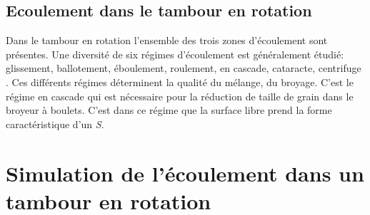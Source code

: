 \subsection{Ecoulement dans le tambour en rotation}

Dans le tambour en rotation l'ensemble des trois zones d'écoulement sont présentes. Une diversité de six régimes d'écoulement est généralement étudié: glissement, ballotement, éboulement, roulement, en cascade, cataracte,  centrifuge \cite{MELLMANN2001251}.
Ces différents régimes déterminent la qualité du mélange, du broyage.
C'est le régime en cascade qui est nécessaire pour la réduction de taille de grain dans le broyeur à boulets. C'est dans ce régime que la surface libre prend la forme caractéristique d'un \textit{S}.


\section{Simulation de l'écoulement dans un tambour en rotation}

